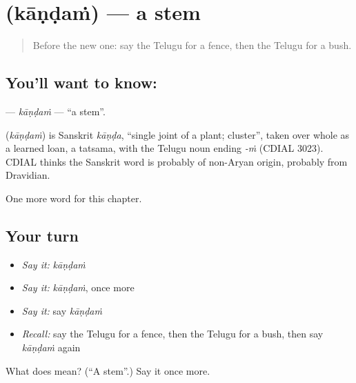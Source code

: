 \section[\texorpdfstring{\te{కాండం} (kāṇḍaṁ)}{కాండం (kāṇḍaṁ)}]{ (kāṇḍaṁ) — a stem}

\label{lesson:TE-C272-kandam}



\begin{quote}
Before the new one: say the Telugu for a fence, then the Telugu for a bush.
\end{quote}

\subsection*{You'll want to know: }
\textbf{} — \emph{kāṇḍaṁ} — \textquotedblleft{}a stem\textquotedblright{}.

\begin{cousinweb}
\textbf{} (\emph{kāṇḍaṁ}) is Sanskrit \emph{kāṇḍa}, \textquotedblleft{}single joint of a plant; cluster\textquotedblright{}, taken over whole as a learned loan, a tatsama, with the Telugu noun ending \emph{-ṁ} (CDIAL 3023). CDIAL thinks the Sanskrit word is probably of non-Aryan origin, probably from Dravidian.
\end{cousinweb}

\begin{grammarlens}[title={What you've built}]
One more word for this chapter.
\end{grammarlens}

\subsection*{Your turn}
\begin{itemize}
\raggedright
  \item \emph{Say it:} \emph{kāṇḍaṁ}
  \item \emph{Say it:} \emph{kāṇḍaṁ}, once more
  \item \emph{Say it:} say \emph{kāṇḍaṁ}
  \item \emph{Recall:} say the Telugu for a fence, then the Telugu for a bush, then say \emph{kāṇḍaṁ} again
\end{itemize}

\begin{tcolorbox}[breakable,colback=teal!4,colframe=teal!35!black,title={Before you move on}]
What does  mean? (\textquotedblleft{}A stem\textquotedblright{}.) Say it once more.
\end{tcolorbox}
